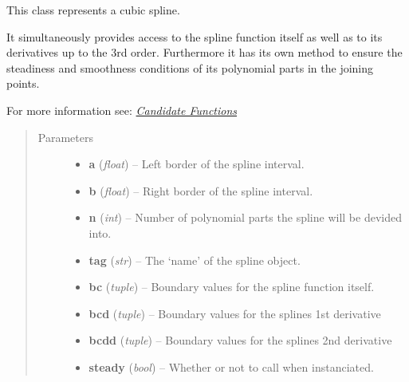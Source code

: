 \documentclass[letterpaper,10pt,english]{sphinxmanual}
\begin{document}
\begin{fulllineitems}
\label{pytrajectory:pytrajectory.spline.CubicSpline}
This class represents a cubic spline.

It simultaneously provides access to the spline function itself as well as to its derivatives
up to the 3rd order. Furthermore it has its own method to ensure the steadiness and smoothness
conditions of its polynomial parts in the joining points.

For more information see: {\hyperref[guide/background:candidate-functions]{\emph{Candidate Functions}}}
\begin{quote}\begin{description}
\item[{Parameters}] \leavevmode\begin{itemize}
\item {} 
\textbf{a} (\emph{float}) -- Left border of the spline interval.

\item {} 
\textbf{b} (\emph{float}) -- Right border of the spline interval.

\item {} 
\textbf{n} (\emph{int}) -- Number of polynomial parts the spline will be devided into.

\item {} 
\textbf{tag} (\emph{str}) -- The `name' of the spline object.

\item {} 
\textbf{bc} (\emph{tuple}) -- Boundary values for the spline function itself.

\item {} 
\textbf{bcd} (\emph{tuple}) -- Boundary values for the splines 1st derivative

\item {} 
\textbf{bcdd} (\emph{tuple}) -- Boundary values for the splines 2nd derivative

\item {} 
\textbf{steady} (\emph{bool}) -- Whether or not to call {\hyperref[pytrajectory:pytrajectory.spline.CubicSpline.makesteady]{}} when instanciated.

\end{itemize}

\end{description}\end{quote}


\end{fulllineitems}
\end{document}
